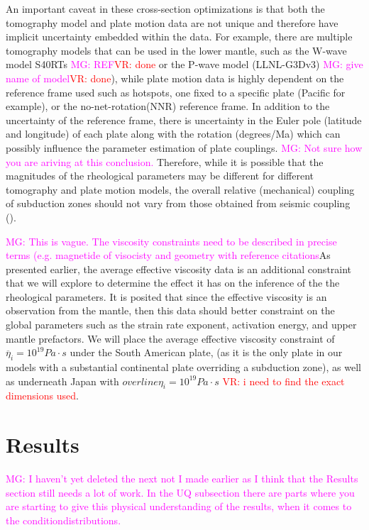 \documentclass[12pt]{article}
\newcommand{\mgnote}[1]{\textcolor{magenta}{MG: #1}}
\newcommand{\vrnote}[1]{\textcolor{red}{VR: #1}}
\begin{document}
An important caveat in these cross-section optimizations is that both the tomography model and plate motion data are not unique and therefore have implicit uncertainty embedded within the data. For example, there are multiple tomography models that can be used in the lower mantle, such as the W-wave model S40RTs \citep{doi:10.1111/j.1365-246X.2010.04884.x}\mgnote{REF}\vrnote{done} or the P-wave model (LLNL-G3Dv3) \mgnote{give name of model}\vrnote{done}\citep{simmons2012llnl}), while plate motion data is highly dependent on the reference frame used such as hotspots, one fixed to a specific plate (Pacific for example), or the no-net-rotation(NNR) reference frame. In addition to the uncertainty of the reference frame, there is uncertainty in the Euler pole (latitude and longitude) of each plate along with the rotation (degrees/Ma) which can possibly influence the parameter estimation of plate couplings. \mgnote{Not sure how you are ariving at this conclusion.} Therefore, while it is possible that the magnitudes of the rheological parameters may be different for different tomography and plate motion models, the overall relative (mechanical) coupling of subduction zones should not vary from those obtained from seismic coupling (\citep{scholz2012seismic}).


\mgnote{This is vague. The viscosity constraints need to be described in precise terms (e.g. magnetide of visocisty and geometry with reference citations}As presented earlier, the average effective viscosity data is an additional constraint that we will explore to determine the effect it has on the inference of the the rheological parameters. It is posited that since the effective viscosity is an observation from the mantle, then this data should better constraint on the global parameters such as the strain rate exponent, activation energy, and upper mantle prefactors. We will place the average effective viscosity constraint of $\overline{\eta}_i = 10^{19} Pa\cdot s$ under the South American plate, (as it is the only plate in our models with a substantial continental plate overriding a subduction zone), as well as underneath Japan with $overline{\eta}_i = 10^{19} Pa\cdot s$ \citep{hu2016asthenosphere} \vrnote{i need to find the exact dimensions used}.

\section{Results}

\mgnote{I haven't yet deleted the next not I made earlier as I think that the Results section still needs a lot of work. In the UQ subsection there are parts where you are starting to give this physical understanding of the results, when it comes to the conditiondistributions.}
\end{document}
